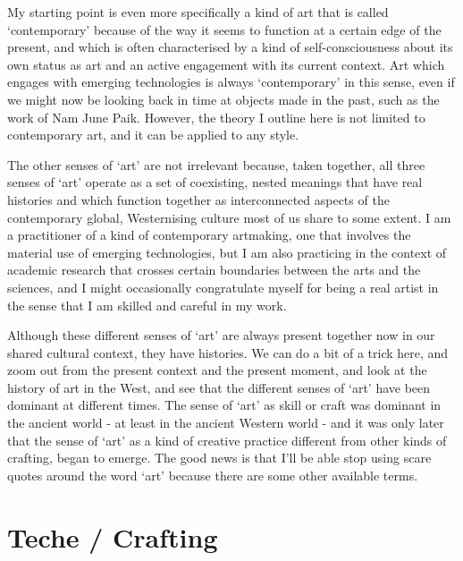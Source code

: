 \documentclass[letterpaper]{article}
\begin{document}
My starting point is even more specifically a kind of art that is called ‘contemporary’ because of the way it seems to function at a certain edge of the present, and which is often characterised by a kind of self-consciousness about its own status as art and an active engagement with its current context. Art which engages with emerging technologies is always ‘contemporary’ in this sense, even if we might now be looking back in time at objects made in the past, such as the work of Nam June Paik. However, the theory I outline here is not limited to contemporary art, and it can be applied to any style.

The other senses of ‘art’ are not irrelevant because, taken together, all three senses of ‘art’ operate as a set of coexisting, nested meanings that have real histories and which function together as interconnected aspects of the contemporary global, Westernising culture most of us share to some extent. I am a practitioner of a kind of contemporary artmaking, one that involves the material use of emerging technologies, but I am also practicing in the context of academic research that crosses certain boundaries between the arts and the sciences, and I might occasionally congratulate myself for being a real artist in the sense that I am skilled and careful in my work.

Although these different senses of ‘art’ are always present together now in our shared cultural context, they have histories. We can do a bit of a trick here, and zoom out from the present context and the present moment, and look at the history of art in the West, and see that the different senses of ‘art’ have been dominant at different times. The sense of ‘art’ as skill or craft was dominant in the ancient world - at least in the ancient Western world - and it was only later that the sense of ‘art’ as a kind of creative practice different from other kinds of crafting, began to emerge. The good news is that I'll be able stop using scare quotes around the word ‘art’ because there are some other available terms.

\section{Teche / Crafting}
\end{document}
